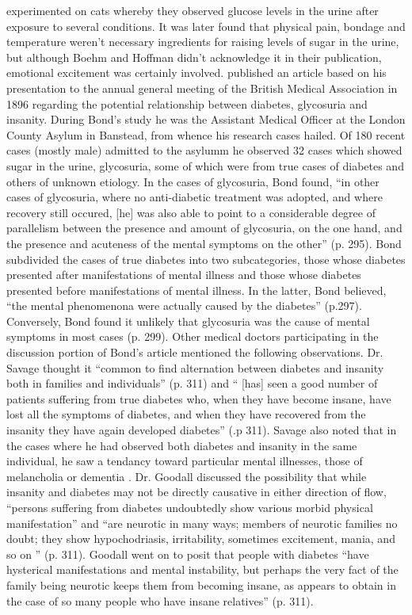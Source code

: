 \documentclass[12pt]{article}
\begin{document}
\citet{boehm_1878_beitrage} experimented on cats whereby they observed glucose levels in the urine after exposure to several conditions. It was later found that physical pain, bondage and temperature weren't necessary ingredients for raising levels of sugar in the urine, but although Boehm and Hoffman didn't acknowledge it in their publication, emotional excitement was certainly involved. 
\citet{bond_1896_relation} published an article based on his presentation to the annual general meeting of the British Medical Association in 1896 regarding the potential relationship between diabetes, glycosuria and insanity. During Bond's study he was the Assistant Medical Officer at the London County Asylum in Banstead, from whence his research cases hailed. Of 180 recent cases (mostly male) admitted to the asylumm he observed 32 cases which showed sugar in the urine, glycosuria, some of which were from true cases of diabetes and others of unknown etiology. In the cases of glycosuria, Bond found, ``in other cases of glycosuria, where no anti-diabetic treatment was adopted, and where recovery still occured, [he] was also able to point to a considerable degree of parallelism between the presence and amount of glycosuria, on the one hand, and the presence and acuteness of the mental symptoms on the other'' (p. 295). Bond subdivided the cases of true diabetes into two subcategories, those whose diabetes presented after manifestations of mental illness and those whose diabetes presented before manifestations of mental illness. In the latter, Bond believed, ``the mental phenomenona were actually caused by the diabetes'' (p.297). Conversely, Bond found it unlikely that glycosuria was the cause of mental symptoms in most cases (p. 299). Other medical doctors participating in the discussion portion of Bond's article mentioned the following observations.
Dr. Savage thought it ``common to find alternation between diabetes and insanity both in families and individuals'' (p. 311) and `` [has] seen a good number of patients suffering from true diabetes who, when they have become insane, have lost all the symptoms of diabetes, and when they have recovered from the insanity they have again developed diabetes'' (.p 311). Savage also noted that in the cases where he had observed both diabetes and insanity in the same individual, he saw a tendancy toward particular mental illnesses, those of melancholia or dementia \citep{bond_1896_relation}. 
Dr. Goodall \citep{bond_1896_relation} discussed the possibility that while insanity and diabetes may not be directly causative in either direction of flow, ``persons suffering from diabetes undoubtedly show various morbid physical manifestation'' and ``are neurotic in many ways; members of neurotic families no doubt; they show hypochodriasis, irritability, sometimes excitement, mania, and so on '' (p. 311). Goodall went on to posit that people with diabetes ``have hysterical manifestations and mental instability, but perhaps the very fact of the family being neurotic keeps them from becoming insane, as appears to obtain in the case of so many people who have insane relatives'' (p. 311). 
\end{document}
